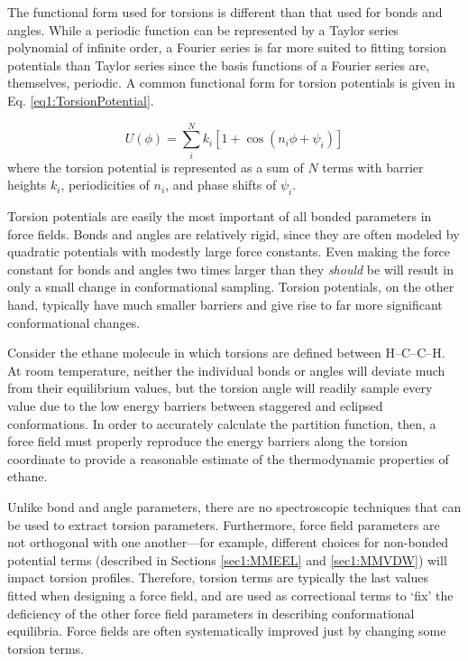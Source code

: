 The functional form used for torsions is different than that used for bonds and
angles. While a periodic function can be represented by a Taylor series
polynomial of infinite order, a Fourier series is far more suited to fitting
torsion potentials than Taylor series since the basis functions of a Fourier
series are, themselves, periodic. A common functional form for torsion
potentials is given in Eq. \ref{eq1:TorsionPotential}.
\cite{Cramer_Book_EssentialsCompChem_2004}

\begin{equation}
   U(\phi) = \sum_i^N k _ i \left [ 1 + \cos \left ( n_i \phi + \psi _ i \right )
             \right ]
   \label{eq1:TorsionPotential}
\end{equation}
where the torsion potential is represented as a sum of $N$ terms with barrier
heights $k_i$, periodicities of $n_i$, and phase shifts of $\psi _ i$.

Torsion potentials are easily the most important of all bonded parameters in
force fields. Bonds and angles are relatively rigid, since they are often
modeled by quadratic potentials with modestly large force constants. Even making
the force constant for bonds and angles two times larger than they \emph{should}
be will result in only a small change in conformational sampling. Torsion
potentials, on the other hand, typically have much smaller barriers and give
rise to far more significant conformational changes.

Consider the ethane molecule in which torsions are defined between H--C--C--H.
At room temperature, neither the individual bonds or angles will deviate much
from their equilibrium values, but the torsion angle will readily sample every
value due to the low energy barriers between staggered and eclipsed
conformations. In order to accurately calculate the partition function, then, a
force field must properly reproduce the energy barriers along the torsion
coordinate to provide a reasonable estimate of the thermodynamic properties of
ethane.

Unlike bond and angle parameters, there are no spectroscopic techniques that can
be used to extract torsion parameters. Furthermore, force field parameters are
not orthogonal with one another---for example, different choices for non-bonded
potential terms (described in Sections \ref{sec1:MMEEL} and \ref{sec1:MMVDW})
will impact torsion profiles. Therefore, torsion terms are typically the last
values fitted when designing a force field, and are used as correctional terms
to `fix' the deficiency of the other force field parameters in describing
conformational equilibria. Force fields are often systematically improved just
by changing some torsion terms. \cite{Hornak_Proteins_2006_v65_p712,
Perez_BiophysJ_2007_v92_p3817, Lindorff-Larsen_Proteins_2010_v78_p1950}

